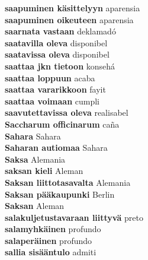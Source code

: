 \textbf{ saapuminen käsittelyyn  } aparensia \\
\textbf{ saapuminen oikeuteen  } aparensia \\
\textbf{ saarnata vastaan  } deklamadó \\
\textbf{ saatavilla oleva  } disponibel \\
\textbf{ saatavissa oleva  } disponibel \\
\textbf{ saattaa jkn tietoon  } konsehá \\
\textbf{ saattaa loppuun  } acaba \\
\textbf{ saattaa vararikkoon  } fayit \\
\textbf{ saattaa voimaan  } cumpli \\
\textbf{ saavutettavissa oleva  } realisabel \\
\textbf{ Saccharum officinarum  } caña \\
\textbf{ Sahara  } Sahara \\
\textbf{ Saharan autiomaa  } Sahara \\
\textbf{ Saksa  } Alemania \\
\textbf{ saksan kieli  } Aleman \\
\textbf{ Saksan liittotasavalta  } Alemania \\
\textbf{ Saksan pääkaupunki  } Berlin \\
\textbf{ Saksan  } Aleman \\
\textbf{ salakuljetustavaraan liittyvä  } preto \\
\textbf{ salamyhkäinen  } profundo \\
\textbf{ salaperäinen  } profundo \\
\textbf{ sallia sisääntulo  } admiti \\
